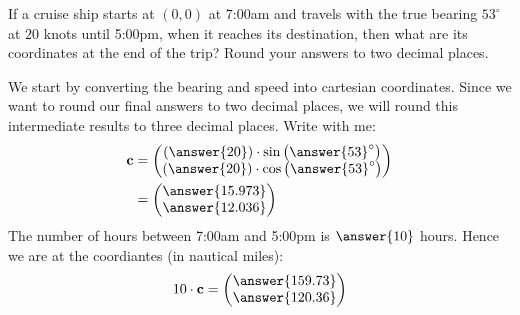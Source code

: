 \documentclass{ximera}
\author{Parisa Fatheddin \and Bart Snapp}
\begin{document}
\begin{exercise}
If a cruise ship starts at $(0,0)$ at 7:00am and travels with the
true bearing $53^\circ$ at $20$ knots until 5:00pm, when it reaches
its destination, then what are its coordinates at the end of the trip?
Round your answers to two decimal places.
\begin{prompt}
  We start by converting the bearing and speed into cartesian
  coordinates. Since we want to round our final answers to two decimal
  places, we will round this intermediate results to three decimal
  places.  Write with me:
  \begin{align*}
    \vec{c} &=
    \begin{pmatrix}
      \left(\answer{20}\right)\cdot\sin\left(\answer{53}^\circ\right)\\
      \left(\answer{20}\right)\cdot\cos\left(\answer{53}^\circ\right)
    \end{pmatrix}\\
    &=\begin{pmatrix}
      \answer{15.973} \\
    \answer{12.036}
  \end{pmatrix}
  \end{align*}
  The number of hours between 7:00am and 5:00pm is $\answer{10}$ hours.
  Hence we are at the coordiantes (in nautical miles):
  \[
10 \cdot \vec{c} = \begin{pmatrix}
      \answer{159.73} \\
    \answer{120.36}
  \end{pmatrix}
  \]
\end{prompt}
\end{exercise}
\end{document}
